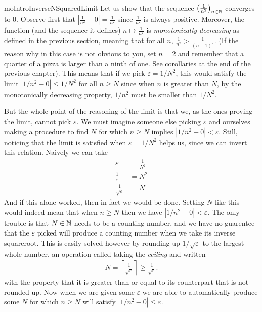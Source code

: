 \documentclass[11pt]{article}
\begin{document}
\begin{label example}{mo}{IntroInverseNSquaredLimit}
Let us show that the sequence $\left(\frac{1}{n^2} \right)_{n \in \mathbb{N}}$ converges to $0$. Observe first that $\left|\frac{1}{n^2} - 0\right| = \frac{1}{n^2}$ since $\frac{1}{n^2}$ is always positive. Moreover, the function (and the sequence it defines) $n \mapsto \frac{1}{n^2}$ is \emph{monotonically decreasing} as defined in the previous section, meaning that for all $n$, $\frac1{n^2} > \frac1{(n+1)^2}$. (If the reason why in this case is not obvious to you, set $n = 2$ and remember that a quarter of a pizza is larger than a ninth of one. See corollaries at the end of the previous chapter). This means that if we pick $\varepsilon = 1/N^2$, this would satisfy the limit $|1/n^2 - 0| \le 1/N^2$ for all $n \ge N$ since when $n$ is greater than $N$, by the monotonically decreasing property, $1/n^2$ must be smaller than $1/N^2$.

But the whole point of the reasoning of the limit is that we, as the ones proving the limit, cannot pick $\varepsilon$. We must imagine someone else picking $\varepsilon$ and ourselves making a procedure to find $N$ for which $n \ge N$ implies $|1/n^2 - 0| < \varepsilon$. Still, noticing that the limit is satisfied when $\varepsilon = 1/N^2$ helps us, since we can invert this relation. Naively we can take \begin{align*}
\varepsilon &= \frac{1}{N^2} \\
\frac{1}{\varepsilon} &= N^2 \\
\frac{1}{\sqrt{\varepsilon}} &= N
\end{align*}
And if this alone worked, then in fact we would be done. Setting $N$ like this would indeed mean that when $n \ge N$ then we have $|1/n^2 - 0| < \varepsilon$. The only trouble is that $N \in \mathbb{N}$ needs to be a counting number, and we have no guarentee that the $\varepsilon$ picked will produce a counting number when we take its inverse squareroot. This is easily solved however by rounding up $1/\sqrt{\varepsilon}$ to the largest whole number, an operation called taking the \emph{ceiling} and written \begin{gather*}
N = \left\lceil \frac{1}{\sqrt{\varepsilon}} \right\rceil \ge \frac{1}{\sqrt{\varepsilon}}.
\end{gather*}
with the property that it is greater than or equal to its counterpart that is not rounded up. Now when we are given some $\varepsilon$ we are able to automatically produce some $N$ for which $n \ge N$ will satisfy $|1/n^2 - 0| \le \varepsilon$.


\end{label example}
\end{document}
